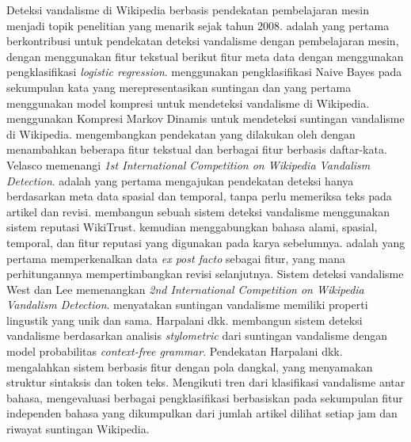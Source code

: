 Deteksi vandalisme di Wikipedia berbasis pendekatan pembelajaran mesin
menjadi topik penelitian yang menarik sejak tahun 2008.
\textcite{potthast2008automatic} adalah yang pertama berkontribusi untuk pendekatan deteksi
vandalisme dengan pembelajaran mesin, dengan menggunakan fitur
tekstual berikut fitur meta data dengan menggunakan pengklasifikasi
\textit{logistic regression}.
\textcite{smets08automaticvandalism} menggunakan pengklasifikasi Naive Bayes
pada sekumpulan kata yang merepresentasikan suntingan dan yang pertama
menggunakan model kompresi untuk mendeteksi vandalisme di Wikipedia.
\textcite{itakura2009using} menggunakan Kompresi Markov Dinamis
untuk mendeteksi suntingan vandalisme di Wikipedia.
\textcite{mola2012wikipedia} mengembangkan pendekatan yang dilakukan
oleh \textcite{potthast2008automatic} dengan menambahkan beberapa fitur
tekstual dan berbagai fitur berbasis daftar-kata.
Velasco memenangi \textit{1st International Competition on Wikipedia Vandalism
Detection}.
\textcite{west2011multilingual} adalah yang pertama
mengajukan pendekatan deteksi hanya berdasarkan meta data
spasial dan temporal, tanpa perlu memeriksa teks pada artikel dan revisi.
\textcite{adler2010detecting} membangun sebuah sistem deteksi vandalisme
menggunakan sistem reputasi WikiTrust.
\textcite{adler2011wikipedia} kemudian menggabungkan bahasa alami,
spasial, temporal, dan fitur reputasi yang digunakan pada karya sebelumnya.
\textcite{west2011multilingual} adalah yang pertama memperkenalkan
data \textit{ex post facto} sebagai fitur, yang mana perhitungannya
mempertimbangkan revisi selanjutnya.
Sistem deteksi vandalisme West dan Lee memenangkan \textit{2nd International
Competition on Wikipedia Vandalism Detection}.
\textcite{harpalani2011language} menyatakan suntingan vandalisme
memiliki properti lingustik yang unik dan sama.
Harpalani dkk. membangun sistem deteksi vandalisme berdasarkan analisis
\textit{stylometric} dari suntingan vandalisme dengan model probabilitas
\textit{context-free grammar}.
Pendekatan Harpalani dkk. mengalahkan sistem berbasis fitur dengan pola
dangkal, yang menyamakan struktur sintaksis dan token teks.
Mengikuti tren dari klasifikasi vandalisme antar bahasa,
\textcite{tran2013cross} mengevaluasi berbagai pengklasifikasi berbasiskan pada
sekumpulan fitur independen bahasa yang dikumpulkan dari jumlah artikel dilihat
setiap jam dan riwayat suntingan Wikipedia.

